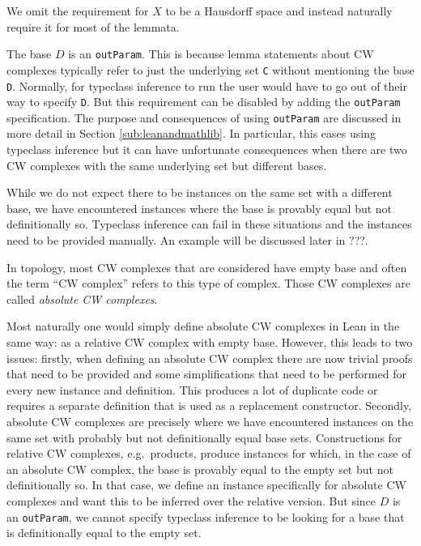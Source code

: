 We omit the requirement for $X$ to be a Hausdorff space and instead naturally require it for most of the lemmata. 

The base $D$ is an \lstinline|outParam|. 
This is because lemma statements about CW complexes typically refer to just the underlying set \lstinline|C| without mentioning the base \lstinline|D|. 
Normally, for typeclass inference to run the user would have to go out of their way to specify \lstinline|D|. 
But this requirement can be disabled by adding the \lstinline|outParam| specification.
The purpose and consequences of using \lstinline|outParam| are discussed in more detail in Section \ref{sub:leanandmathlib}.
In particular, this eases using typeclass inference but it can have unfortunate consequences when there are two CW complexes with the same underlying set but different bases.

While we do not expect there to be instances on the same set with a different base, we have encountered instances where the base is provably equal but not definitionally so. 
Typeclass inference can fail in these situations and the instances need to be provided manually. 
An example will be discussed later in ???. 

In topology, most CW complexes that are considered have empty base and often the term ``CW complex'' refers to this type of complex. 
Those CW complexes are called \emph{absolute CW complexes}. 

Most naturally one would simply define absolute CW complexes in Lean in the same way: as a relative CW complex with empty base. 
However, this leads to two issues: 
firstly, when defining an absolute CW complex there are now trivial proofs that need to be provided and some simplifications that need to be performed for every new instance and definition. 
This produces a lot of duplicate code or requires a separate definition that is used as a replacement constructor. 
Secondly, absolute CW complexes are precisely where we have encountered instances on the same set with probably but not definitionally equal base sets. 
Constructions for relative CW complexes, e.g.\ products, produce instances for which, in the case of an absolute CW complex, the base is provably equal to the empty set but not definitionally so. 
In that case, we define an instance specifically for absolute CW complexes and want this to be inferred over the relative version. 
But since $D$ is an \lstinline|outParam|, we cannot specify typeclass inference to be looking for a base that is definitionally equal to the empty set. 


